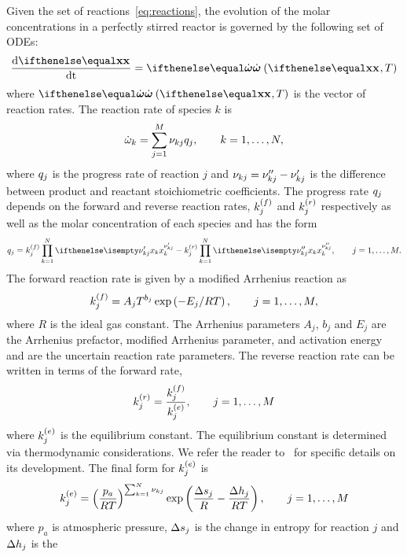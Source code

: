 \documentclass[fontsize=12pt, %
               paper=a4, %
               hyperref]{report}
\begin{document}
  Given the set of reactions~\eqref{eq:reactions}, the evolution of the
  molar concentrations in a perfectly stirred reactor is governed by the
  following set of ODEs:
  \begin{align}
     \odeone{\xc}{\time} = \rr\lr{\xc, T} \label{eq:ode_reactions}
  \end{align}
  where $\rr\lr{\xc, T}$ is the vector of reaction rates.  The reaction 
  rate of species $k$ is
  \begin{align}
    \dot{\omega}_{k} = \sum_{j=1}^{M}{\nu_{kj}q_{j}}, \qquad k = 1,\ldots,N,
    \label{eq:rrk}
  \end{align}
  where $q_{j}$ is the progress rate of reaction $j$ and $\nu_{kj} =
  \nu_{kj}^{\prime\prime} - \nu_{kj}^{\prime}$ is the difference between product and reactant
  stoichiometric coefficients.  The progress rate $q_{j}$ depends on
  the forward and reverse reaction rates, $k_{j}^{\left(f\right)}$ and $k_{j}^{\left(r\right)}$ respectively
  as well as the molar concentration of each species and has the form
  \begin{align}
    \pr{j} = \kf\prod_{k=1}^{N}{\displaystyle\xk{k}{\nur}} - 
             \kr\prod_{k=1}^{N}{\displaystyle\xk{k}{\nup}}, 
    \qquad j = 1,\ldots,M.
  \end{align}
  The forward reaction rate is given by a modified Arrhenius 
  reaction as
  \begin{align}
    k_{j}^{\left(f\right)} = A_{j}T^{b_{j}}\exp\left(-E_{j}/RT\right), 
    \qquad j = 1,\ldots,M, 
    \label{eq:arrhenius}
  \end{align}
  where $R$ is the ideal gas constant.  The Arrhenius parameters $A_{j}$, $b_{j}$ and $E_{j}$ 
  are the Arrhenius prefactor, modified Arrhenius parameter, and activation energy and are the 
  uncertain reaction rate parameters.  The reverse reaction rate can be written in terms of the 
  forward rate,
  \begin{align}
    k_{j}^{\left(r\right)} = \frac{k_{j}^{\left(f\right)}}{k_{j}^{\left(e\right)}}, \qquad j = 1,\ldots,M
  \end{align}
  where $k_{j}^{\left(e\right)}$ is the equilibrium constant.  The equilibrium 
  constant is determined via thermodynamic considerations.  We 
  refer the reader to~\cite[Ch.9.3]{kee2005chemically} for specific 
  details on its development.  The final form for $k_{j}^{\left(e\right)}$ is 
  \begin{align}
    k_{j}^{\left(e\right)} = \left(\frac{p_{a}}{RT}\right)^{\sum_{k=1}^{N}{\nu_{kj}}}
          \exp\left(\frac{\Delta s_{j}}{R} - \frac{\Delta h_{j}}{RT}\right), 
    \qquad j = 1,\ldots,M \label{eq:ke}
  \end{align}
  where $p_{a}$ is atmospheric pressure, $\Delta s_{j}$ is the 
  change in entropy for reaction $j$ and $\Delta h_{j}$ is the 
\end{document}
